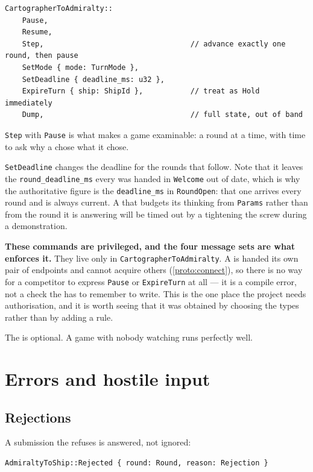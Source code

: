 \documentclass{article}
\begin{document}
\begin{lstlisting}
CartographerToAdmiralty::
    Pause,
    Resume,
    Step,                                  // advance exactly one round, then pause
    SetMode { mode: TurnMode },
    SetDeadline { deadline_ms: u32 },
    ExpireTurn { ship: ShipId },           // treat as Hold immediately
    Dump,                                  // full state, out of band
\end{lstlisting}

\texttt{Step} with \texttt{Pause} is what makes a game examinable: a round at a time, with time to
ask why a \ship{} chose what it chose.

\texttt{SetDeadline} changes the deadline for the rounds that follow. Note that it leaves the
\texttt{round\_deadline\_ms} every \ship{} was handed in \texttt{Welcome} out of date, which is
why the authoritative figure is the \texttt{deadline\_ms} in \texttt{RoundOpen}: that one arrives
every round and is always current. A \ship{} that budgets its thinking from \texttt{Params} rather
than from the round it is answering will be timed out by a \cartographer{} tightening the screw
during a demonstration.

\textbf{These commands are privileged, and the four message sets are what enforces it.} They live
only in \texttt{CartographerToAdmiralty}. A \ship{} is handed its own pair of endpoints
and cannot acquire others (\cref{proto:connect}), so there is no way for a competitor to express
\texttt{Pause} or \texttt{ExpireTurn} at all --- it is a compile error, not a check the
\admiralty{} has to remember to write. This is the one place the project needs authorisation, and
it is worth seeing that it was obtained by choosing the types rather than by adding a rule.

The \cartographer{} is optional. A game with nobody watching runs perfectly well.

\newpage
\section{Errors and hostile input}
\label{proto:errors}

\subsection{Rejections}

A submission the \chart{} refuses is answered, not ignored:

\begin{lstlisting}
AdmiraltyToShip::Rejected { round: Round, reason: Rejection }
\end{lstlisting}
\end{document}
